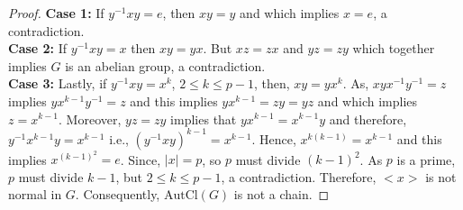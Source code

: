 \documentclass{article}
\theoremstyle{definition}
\begin{document}
\begin{proof}
\textbf{Case 1:} If $y^{-1}xy=e$, then $xy=y$ and which implies $x=e$, a contradiction.\vspace{0.2cm}\\ 
\textbf{Case 2:} If $y^{-1}xy=x$ then $xy=yx$. But $xz=zx$ and $yz=zy$ which together implies $G$ is an abelian group, a contradiction. \vspace{0.2cm}\\
\textbf{Case 3:} Lastly, if $y^{-1}xy=x^k$, $2\le k \le p-1$, then, $xy=yx^k$. As, $xyx^{-1}y^{-1}=z$ implies $yx^{k-1}y^{-1}=z$ and this implies $yx^{k-1}=zy=yz$ and which implies $z=x^{k-1}$. Moreover, $yz=zy$ implies that $yx^{k-1}=x^{k-1}y$ and therefore, $y^{-1}x^{k-1}y=x^{k-1}$ i.e., $(y^{-1}xy)^{k-1}=x^{k-1}$. Hence, $x^{k(k-1)}=x^{k-1}$ and this implies $x^{(k-1)^2}=e$. Since, $|x|=p$, so $p$ must divide $(k-1)^2$. As $p$ is a prime, $p$ must divide $k-1$, but $2\le k \le p-1$, a contradiction. Therefore, $\bigl<x\bigr>$ is not normal in $G$. Consequently, $\text{AutCl}(G)$ is not a chain.
\end{proof}
\end{document}
